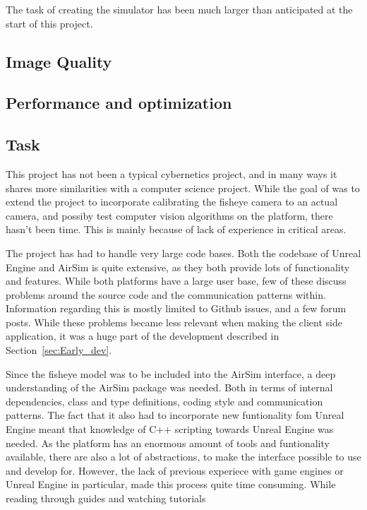 The task of creating the simulator has been much larger than anticipated at the start of this project. 

\subsection{Image Quality}

\subsection{Performance and optimization}

\subsection{Task}

This project has not been a typical cybernetics project, and in many ways it shares more similarities with a computer science project. While the goal of was to extend the project to incorporate calibrating the fisheye camera to an actual camera, and possiby test computer vision algorithms on the platform, there hasn't been time. This is mainly because of lack of experience in critical areas. 

The project has had to handle very large code bases. Both the codebase of Unreal Engine and AirSim is quite extensive, as they both provide lots of functionality and features. While both platforms have a large user base, few of these discuss problems around the source code and the communication patterns within. Information regarding this is mostly limited to Github issues, and a few forum posts. While these problems became less relevant when making the client side application, it was a huge part of the development described in Section~\ref{sec:Early_dev}. 

Since the fisheye model was to be included into the AirSim interface, a deep understanding of the AirSim package was needed. Both in terms of internal dependencies, class and type definitions, coding style and communication patterns. The fact that it also had to incorporate new funtionality fom Unreal Engine meant that knowledge of C++ scripting towards Unreal Engine was needed. As the platform has an enormous amount of tools and funtionality available, there are also a lot of abstractions, to make the interface possible to use and develop for. However, the lack of previous experiece with game engines or Unreal Engine in particular, made this process quite time consuming. While reading through guides and watching tutorials

